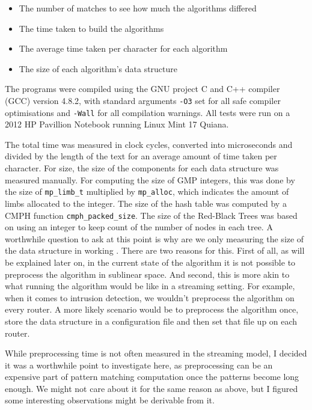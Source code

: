 \documentclass[ %
                    author={Dominic Joseph Moylett},
                    degree={MEng},
                     title={Dictionary Matching with Fingerprints},
                  subtitle={An Empirical Analysis},
                      type={research},
                      year={2015} ]{dissertation}
\begin{document}
\begin{itemize}
  \item The number of matches to see how much the algorithms differed
  \item The time taken to build the algorithms
  \item The average time taken per character for each algorithm
  \item The size of each algorithm's data structure
\end{itemize}

The programs were compiled using the GNU project C and C++ compiler (GCC) version 4.8.2, with standard arguments \texttt{-O3} set for all safe compiler optimisations and \texttt{-Wall} for all compilation warnings. All tests were run on a 2012 HP Pavillion Notebook running Linux Mint 17 Quiana.

The total time was measured in clock cycles, converted into microseconds and divided by the length of the text for an average amount of time taken per character. For size, the size of the components for each data structure was measured manually. For computing the size of GMP integers, this was done by the size of \texttt{mp\_limb\_t} multiplied by \texttt{mp\_alloc}, which indicates the amount of limbs allocated to the integer. The size of the hash table was computed by a CMPH function \texttt{cmph\_packed\_size}. The size of the Red-Black Trees was based on using an integer to keep count of the number of nodes in each tree. A worthwhile question to ask at this point is why are we only measuring the size of the data structure in working . There are two reasons for this. First of all, as will be explained later on, in the current state of the algorithm it is not possible to preprocess the algorithm in sublinear space. And second, this is more akin to what running the algorithm would be like in a streaming setting. For example, when it comes to intrusion detection, we wouldn't preprocess the algorithm on every router. A more likely scenario would be to preprocess the algorithm once, store the data structure in a configuration file and then set that file up on each router.

While preprocessing time is not often measured in the streaming model, I decided it was a worthwhile point to investigate here, as preprocessing can be an expensive part of pattern matching computation once the patterns become long enough. We might not care about it for the same reason as above, but I figured some interesting observations might be derivable from it.
\end{document}
